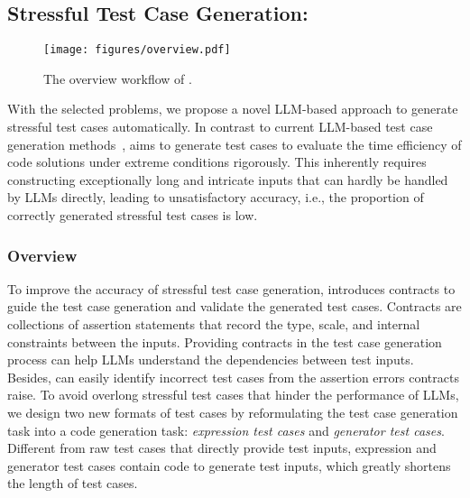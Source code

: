 \subsection{Stressful Test Case Generation: \tool}
\begin{figure*}[tbp]
    \centering
    \texttt{[image: figures/overview.pdf]}
    \vspace{-20pt}
    \caption{The overview workflow of \tool.} 
    \label{fig: overview}
    \vspace{-10pt}
\end{figure*}

With the selected problems, we propose a novel LLM-based approach \tool to generate stressful test cases automatically. In contrast to current LLM-based test case generation methods~\cite{liu2023is, li24large,ouédraogo24large,bhatia23unit,max24an,sami24a}, \tool aims to generate test cases to evaluate the time efficiency of code solutions under extreme conditions rigorously. This inherently requires constructing exceptionally long and intricate inputs that can hardly be handled by LLMs directly, leading to unsatisfactory accuracy, i.e., the proportion of correctly generated stressful test cases is low.


\subsubsection{Overview}

To improve the accuracy of stressful test case generation, \tool introduces contracts to guide the test case generation and validate the generated test cases. Contracts are collections of assertion statements that record the type, scale, and internal constraints between the inputs. Providing contracts in the test case generation process can help LLMs understand the dependencies between test inputs. Besides, \tool can easily identify incorrect test cases from the assertion errors contracts raise. To avoid overlong stressful test cases that hinder the performance of LLMs, we design two new formats of test cases by reformulating the test case generation task into a code generation task: \textit{expression test cases} and \textit{generator test cases}. Different from raw test cases that directly provide test inputs, expression and generator test cases contain code to generate test inputs, which greatly shortens the length of test cases. 


